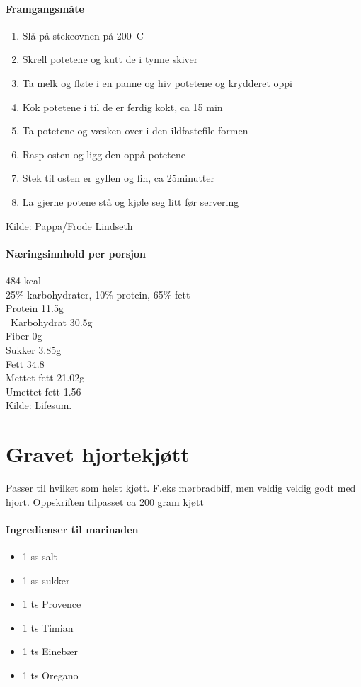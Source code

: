 \documentclass[12pt,a4paper]{book}
\begin{document}
\paragraph{Framgangsmåte}
\begin{enumerate}[noitemsep]
	\item Slå på stekeovnen på 200\degree~C
	\item Skrell potetene og kutt de i tynne skiver
	\item Ta melk og fløte i en panne og hiv potetene og krydderet oppi
	\item Kok potetene i til de er ferdig kokt, ca 15 min
	\item Ta potetene og væsken over i den ildfastefile formen
	\item Rasp osten og ligg den oppå potetene
	\item Stek til osten er gyllen og fin, ca 25minutter
	\item La gjerne potene stå og kjøle seg litt før servering
\end{enumerate}

Kilde: Pappa/Frode Lindseth\\


\paragraph{Næringsinnhold per porsjon}
484 kcal\\
25\% karbohydrater, 10\% protein, 65\% fett\\
Protein 11.5g\\\
Karbohydrat 30.5g\\
Fiber 0g\\
Sukker 3.85g\\
Fett 34.8\\
Mettet fett 21.02g\\
Umettet fett 1.56\\
Kilde: Lifesum.
\clearpage{}
\clearpage{}\section{﻿Gravet hjortekjøtt}
Passer til hvilket som helst kjøtt. F.eks mørbradbiff, men veldig veldig godt med hjort.
Oppskriften tilpasset ca 200 gram kjøtt

\paragraph{Ingredienser til marinaden}
\begin{itemize}[noitemsep]
	\item 1 ss salt
	\item 1 ss sukker
	\item 1 ts Provence
	\item 1 ts Timian
	\item 1 ts Einebær
	\item 1 ts Oregano
\end{itemize}
\end{document}
